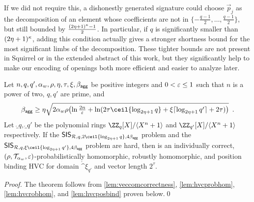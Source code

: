 \begin{remark}
\begin{enumerate}
{If we did not require this, a dishonestly generated signature could choose $\vec{p}_j$ as the decomposition of an element whose coefficients are not in $\{-\tfrac{q-1}{2},\ldots,\tfrac{q-1}{2}\}$, but still bounded by $\frac{(2\eta+1)^\kappa-1}{2}$.
In particular, if $q$ is significantly smaller than $(2\eta+1)^\kappa$, adding this condition actually gives a stronger shortness bound for the most significant limbs of the decomposition.
These tighter bounds are not present in Squirrel or in the extended abstract of this work\cite{TODO}, but they significantly help to make our encoding of openings both more efficient and easier to analyze later.%
}
\end{enumerate}
\end{remark}

\begin{theorem}\label{theo:veccom}
  Let $n,q,q',\alpha_w,\rho,\eta,\tau,\xi,\beta_{\mathsf{agg}}$ be positive integers and $0 < \varepsilon \leq 1$ such that $n$ is a power of two, $q,q'$ are prime, and 
\[
\bagg \geq \eta\sqrt{2\alpha_w\rho
  \bigl(
  \ln\tfrac{2n}{\errorbound} +  \ln(2\tau \ceil{\log_{2\eta+1}q} + \xi\lceil\log_{2\eta+1}q'\rceil \eprint{+ 2\tau})
  \bigr)}\enspace.
\]
  Let $\ring_q,\ring_{q'}$ be the polynomial rings $\defringq$ and $\defringqq$ respectively.
  If the $\sis_{\ring,q,2\ceil{\log_{2\eta+1} q},4\bagg}$ problem and the $\sis_{\ring,q,\xi\ceil{\log_{2\eta+1} q'} ,4\bagg}$ problem are hard,
  then \eprint{$\hvcplain$}\cameraready{$\hvccamera$} is an individually correct, $(\rho,\mathcal{T}_{\alpha_w},\varepsilon)$-probabilistically homomorphic, robustly homomorphic, and position binding HVC for domain $\ring^{\xi}_{q'}$ and vector length $2^\tau$.
\end{theorem}
\begin{proof}
  The theorem follows from \autoref{lem:veccomcorrectness}, \autoref{lem:hvcprobhom}, \autoref{lem:hvcrobhom}, and \autoref{lem:hvcposbind} proven below.\qed
\end{proof}

